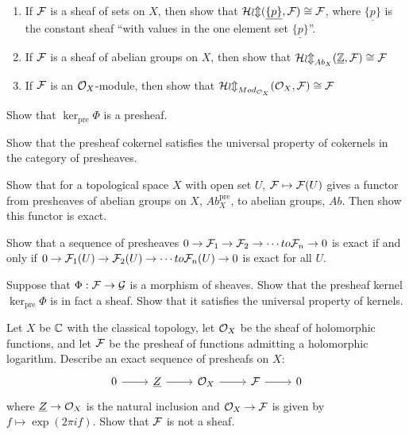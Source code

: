 \begin{exercise} \mbox{}
    \begin{enumerate}[label = (\alph*)]
        \item If $\mathcal{F}$ is a sheaf of sets on $X$, then show that $\mathcal{Hom}(\underline{\{p\}}, \mathcal{F}) \cong \mathcal{F}$, where $\underline{\{p\}}$ is the constant sheaf ``with values in the one element set $\underline{\{p\}}$''. 
        \item If $\mathcal{F}$ is a sheaf of abelian groups on $X$, then show that $\mathcal{Hom}_{Ab_X}(\underline{\mathbb{Z}}, \mathcal{F}) \cong \mathcal{F}$
        \item If $\mathcal{F}$ is an $\mathcal{O}_X$-module, then show that $\mathcal{Hom}_{Mod_{\mathcal{O}_X}}(\mathcal{O}_X, \mathcal{F}) \cong \mathcal{F}$ 
    \end{enumerate}
\end{exercise}

\begin{exercise}
    Show that $\ker_{\text{pre}}\Phi$ is a presheaf. 
\end{exercise}

\begin{exercise}
    Show that the presheaf cokernel satisfies the universal property of cokernels in the category of presheaves. 
\end{exercise}

\begin{exercise}
    Show that for a topological space $X$ with open set $U$, $\mathcal{F} \mapsto \mathcal{F}(U)$ gives a functor from presheaves of abelian groups on $X$, $Ab^{\text{pre}}_X$, to abelian groups, $Ab$. Then show this functor is exact. 
\end{exercise}

\begin{exercise}
    Show that a sequence of presheaves $0 \to \mathcal{F}_1 \to \mathcal{F}_2 \to \cdots to \mathcal{F}_n \to 0$ is exact if and only if $0 \to \mathcal{F}_1(U) \to \mathcal{F}_2(U) \to \cdots to \mathcal{F}_n(U) \to 0$ is exact for all $U$. 
\end{exercise}

\begin{exercise}
    Suppose that $\Phi: \mathcal{F} \to \mathcal{G}$ is a morphism of sheaves. Show that the presheaf kernel $\ker_{\text{pre}}\Phi$ is in fact a sheaf. Show that it satisfies the universal property of kernels. 
\end{exercise}

\begin{exercise}
    Let $X$ be $\mathbb{C}$ with the classical topology, let $\mathcal{O}_X$ be the sheaf of holomorphic functions, and let $\mathcal{F}$ be the presheaf of functions admitting a holomorphic logarithm. Describe an exact sequence of presheafs on $X$:  
    \[ \begin{tikzcd}
        0 \arrow[r] & \underline{Z} \arrow[r] & \cO_X \arrow[r] & \cF \arrow[r] & 0
    \end{tikzcd} \]
    where $\underline{Z} \to \mathcal{O}_X$ is the natural inclusion and $\mathcal{O}_X \to \mathcal{F}$ is given by $f \mapsto \exp(2 \pi i f)$. Show that $\mathcal{F}$ is not a sheaf. 
\end{exercise}